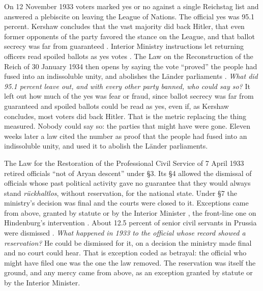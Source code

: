 On 12 November 1933 voters marked yes or no against a single Reichstag list \autocite[109]{evans2006power} and answered a plebiscite on leaving the League of Nations. The official yes was 95.1 percent. Kershaw concludes that the vast majority did back Hitler, that even former opponents of the party favored the stance on the League, and that ballot secrecy was far from guaranteed \autocite[495]{kershaw1999hubris}. Interior Ministry instructions let returning officers read spoiled ballots as yes votes \autocite[109]{evans2006power}. The Law on the Reconstruction of the Reich of 30 January 1934 then opens by saying the vote “proved” the people had fused into an indissoluble unity, and abolishes the Länder parliaments \autocite{neuaufbau1934}. \emph{What did 95.1 percent leave out, and with every other party banned, who could say so?} It left out how much of the yes was fear or fraud, since ballot secrecy was far from guaranteed and spoiled ballots could be read as yes, even if, as Kershaw concludes, most voters did back Hitler. That is the metric replacing the thing measured. Nobody could say so: the parties that might have were gone. Eleven weeks later a law cited the number as proof that the people had fused into an indissoluble unity, and used it to abolish the Länder parliaments.

The Law for the Restoration of the Professional Civil Service of 7 April 1933 retired officials “not of Aryan descent” under \S3. Its \S4 allowed the dismissal of officials whose past political activity gave no guarantee that they would always stand \emph{rückhaltlos}, without reservation, for the national state. Under \S7 the ministry's decision was final and the courts were closed to it. Exceptions came from above, granted by statute or by the Interior Minister \autocite{bbg1933}, the front-line one on Hindenburg's intervention \autocite[474]{kershaw1999hubris}. About 12.5 percent of senior civil servants in Prussia were dismissed \autocite[383]{evans2004coming}. \emph{What happened in 1933 to the official whose record showed a reservation?} He could be dismissed for it, on a decision the ministry made final and no court could hear. That is exception coded as betrayal: the official who might have filed one was the one the law removed. The reservation was itself the ground, and any mercy came from above, as an exception granted by statute or by the Interior Minister.

